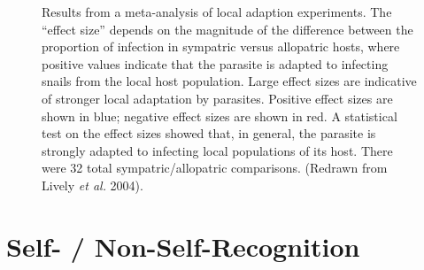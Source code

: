 \documentclass[
  letterpaper,
]{book}
\begin{document}
\begin{figure}


\caption[Results from a meta-analysis of local adaption
experiments]{\label{fig-4.5}Results from a meta-analysis of local
adaption experiments. The ``effect size'' depends on the magnitude of
the difference between the proportion of infection in sympatric versus
allopatric hosts, where positive values indicate that the parasite is
adapted to infecting snails from the local host population. Large effect
sizes are indicative of stronger local adaptation by parasites. Positive
effect sizes are shown in blue; negative effect sizes are shown in red.
A statistical test on the effect sizes showed that, in general, the
parasite is strongly adapted to infecting local populations of its host.
There were 32 total sympatric/allopatric comparisons. (Redrawn from
Lively \emph{et al.} 2004).}

\end{figure}%

\section{Self- / Non-Self-Recognition}\label{self--non-self-recognition}
\end{document}
